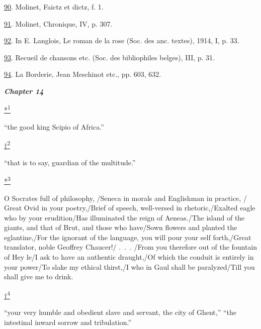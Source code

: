 \protect\hypertarget{23_NOTES.xhtmlux5cux23id_133}{\protect\hyperlink{21_Chapter_Thirteen__IMAGE_AND_WORD.xhtmlux5cux23id_132}{90}}.
Molinet, Faictz et dictz, f. 1.

\protect\hypertarget{23_NOTES.xhtmlux5cux23id_131}{\protect\hyperlink{21_Chapter_Thirteen__IMAGE_AND_WORD.xhtmlux5cux23id_130}{91}}.
Molinet, Chronique, IV, p. 307.

\protect\hypertarget{23_NOTES.xhtmlux5cux23id_129}{\protect\hyperlink{21_Chapter_Thirteen__IMAGE_AND_WORD.xhtmlux5cux23id_128}{92}}.
In E. Langlois, Le roman de la rose (Soc. des anc. textes), 1914, I, p.
33.

\protect\hypertarget{23_NOTES.xhtmlux5cux23id_127}{\protect\hyperlink{21_Chapter_Thirteen__IMAGE_AND_WORD.xhtmlux5cux23id_126}{93}}.
Recueil de chansons etc. (Soc. des bibliophiles belges), III, p. 31.

\protect\hypertarget{23_NOTES.xhtmlux5cux23id_125}{\protect\hyperlink{21_Chapter_Thirteen__IMAGE_AND_WORD.xhtmlux5cux23id_124}{94}}.
La Borderie, Jean Meschinot etc., pp. 603, 632.

\textbf{\emph{\protect\hypertarget{23_NOTES.xhtmlux5cux23page_439}{}{}Chapter
14}}

\protect\hypertarget{23_NOTES.xhtmlux5cux23id_2804}{\protect\hyperlink{22_Chapter_Fourteen__THE_COMING_OF.xhtmlux5cux23id_2803}{*\textsuperscript{1}}}
``the good king Scipio of Africa.''

\protect\hypertarget{23_NOTES.xhtmlux5cux23id_2802}{\protect\hyperlink{22_Chapter_Fourteen__THE_COMING_OF.xhtmlux5cux23id_2801}{†\textsuperscript{2}}}
``that is to say, guardian of the multitude.''

\protect\hypertarget{23_NOTES.xhtmlux5cux23id_2800}{\protect\hyperlink{22_Chapter_Fourteen__THE_COMING_OF.xhtmlux5cux23id_2799}{*\textsuperscript{3}}}
O Socrates full of philosophy, /Seneca in morals and Englishman in
practice, / Great Ovid in your poetry,/Brief of speech, well-versed in
rhetoric,/Exalted eagle who by your erudition/Has illuminated the reign
of Aeneas./The island of the giants, and that of Brut, and those who
have/Sown flowers and planted the eglantine,/For the ignorant of the
language, you will pour your self forth,/Great translator, noble
Geoffrey Chaucer!/ .~.~. /From you therefore out of the fountain of Hey
le/I ask to have an authentic draught,/Of which the conduit is entirely
in your power/To slake my ethical thirst,/I who in Gaul shall be
paralyzed/Till you shall give me to drink.

\protect\hypertarget{23_NOTES.xhtmlux5cux23id_2798}{\protect\hyperlink{22_Chapter_Fourteen__THE_COMING_OF.xhtmlux5cux23id_2797}{†\textsuperscript{4}}}
``your very humble and obedient slave and servant, the city of Ghent,''
``the intestinal inward sorrow and tribulation.''

